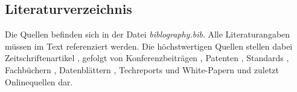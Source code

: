 \documentclass[conference]{IEEEtran}
\begin{document}
\subsection{Literaturverzeichnis}
Die Quellen befinden sich in der Datei \textit{biblography.bib}. 
Alle Literaturangaben müssen im Text referenziert werden. Die höchstwertigen Quellen stellen dabei Zeitschriftenartikel \cite{Laprie2004}, gefolgt von Konferenzbeiträgen \cite{Agrou2011}, Patenten \cite{Grisenthwaite2012}, Standards \cite{ARINC2005}, Fachbüchern \cite{Kopetz2011},  Datenblättern \cite{Freescale2015}, Techreports und White-Papern \cite{Aswadhati2011} und zuletzt Onlinequellen \cite{Xil2010} dar.



\end{document}
